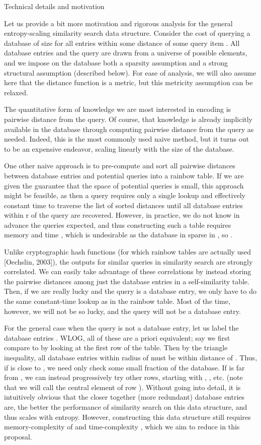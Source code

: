 \documentclass{amsbook}
\theoremstyle{definition}
\theoremstyle{remark}
\numberwithin{equation}{section}
\begin{document}
Technical details and motivation

Let us provide a bit more motivation and rigorous analysis for the general entropy-scaling similarity search data structure.
Consider the cost of querying a database of size  for all entries within some distance  of some query item .
All database entries and the query are drawn from a universe  of possible elements, and we impose on the database both a sparsity assumption and a strong structural assumption (described below).
For ease of analysis, we will also assume here that the distance function is a metric, but this metricity assumption can be relaxed.

The quantitative form of knowledge we are most interested in encoding is pairwise distance from the query.
Of course, that knowledge is already implicitly available in the database through computing pairwise distance from the query as needed.
Indeed, this is the most commonly used naive method, but it turns out to be an expensive endeavor, scaling linearly with the size of the database.

One other naive approach is to pre-compute and sort all pairwise distances between database entries and potential queries into a rainbow table.
If we are given the guarantee that the space of potential queries is small, this approach might be feasible, as then a query requires only a single lookup and effectively constant time to traverse the list of sorted distances until all database entries within r of the query are recovered.
However, in practice, we do not know in advance the queries expected, and thus constructing such a table requires memory  and time , which is undesirable as the database in sparse in , so .

Unlike cryptographic hash functions (for which rainbow tables are actually used [Oechslin, 2003]), the outputs for similar queries in similarity search are strongly correlated.
We can easily take advantage of these correlations by instead storing the pairwise distances among just the database entries in a self-similarity table.
Then, if we are really lucky and the query is a database entry, we only have to do the same constant-time lookup as in the rainbow table.
Most of the time, however, we will not be so lucky, and the query will not be a database entry.


For the general case when the query is not a database entry, let us label the database entries .
WLOG, all of these are a priori equivalent; say we first compare  to  by looking at the first row of the table.
Then by the triangle inequality, all database entries within radius  of  must be within distance  of .
Thus, if  is close to , we need only check some small fraction of the database.
If  is far from , we can instead progressively try other rows, starting with , , etc.
(note that we will call  the central element of row ).
Without going into detail, it is intuitively obvious that the closer together (more redundant) database entries are, the better the performance of similarity search on this data structure, and thus scales with entropy.
However, constructing this data structure still requires memory-complexity of  and time-complexity , which we aim to reduce in this proposal.
\end{document}
